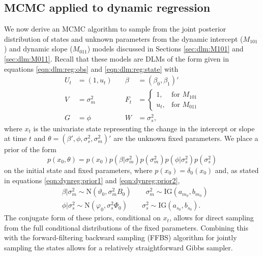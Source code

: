 \subsection{MCMC applied to dynamic regression \label{sec:mcmc:dr}}

We now derive an MCMC algorithm to sample from the joint posterior distribution of states and unknown parameters from the dynamic intercept ($M_{101}$) and dynamic slope ($M_{011}$) models discussed in Sections \ref{sec:dlm:M101} and \ref{sec:dlm:M011}. Recall that these models are DLMs of the form given in equations \eqref{eqn:dlm:reg:obs} and \eqref{eqn:dlm:reg:state} with
\begin{align*}
U_t &= (1, u_t) &\quad \beta &= (\beta_0, \beta_1)' \\
V &= \sigma^2_m &\quad F_t &= \left\{\begin{array}{ll} 1, & \mbox{for } M_{101} \\ u_t, & \mbox{for } M_{011} \end{array}\right. \\
G &= \phi &\quad W &= \sigma^2_s,
\end{align*}
where $x_t$ is the univariate state representing the change in the intercept or slope at time $t$ and $\theta = (\beta',\phi,\sigma^2_s,\sigma^2_m)'$ are the unknown fixed parameters. We place a prior of the form
\begin{equation}
p(x_0, \theta) = p(x_0)p(\beta|\sigma^2_m)p(\sigma^2_m)p(\phi|\sigma^2_s)p(\sigma^2_s) \label{eqn:dr:prior}
\end{equation}
on the initial state and fixed parameters, where $p(x_0) = \delta_0(x_0)$ and, as stated in equations \eqref{eqn:dynreg:prior1} and \eqref{eqn:dynreg:prior2},
\begin{align*}
&\beta|\sigma^2_m \sim \mbox{N}(\vartheta_0, \sigma^2_mB_0) \qquad \sigma^2_m \sim \mbox{IG}(a_{m_0}, b_{m_0}) \\
&\phi|\sigma^2_s \sim \mbox{N}(\varphi_0, \sigma^2_s\Phi_0) \qquad \sigma^2_s \sim \mbox{IG}(a_{s_0}, b_{s_0}).
\end{align*}
The conjugate form of these priors, conditional on $x_t$, allows for direct sampling from the full conditional distributions of the fixed parameters. Combining this with the forward-filtering backward sampling (FFBS) algorithm for jointly sampling the states \citep{Cart:Kohn:on:1994} allows for a relatively straightforward Gibbs sampler.

